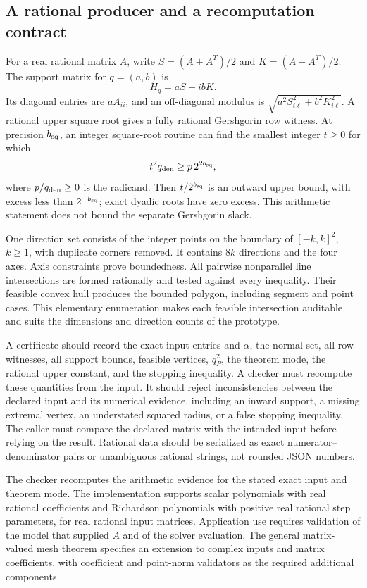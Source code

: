 \documentclass[11pt]{article}
\theoremstyle{definition}
\theoremstyle{remark}
\numberwithin{equation}{section}
\begin{document}
\subsection{A rational producer and a recomputation contract}
For a real rational matrix \(A\), write
\(S=(A+A^T)/2\) and \(K=(A-A^T)/2\).
The support matrix for \(q=(a,b)\) is
\[
 H_q=aS-ibK.
\]
Its diagonal entries are \(aA_{ii}\), and an off-diagonal modulus is
\(\sqrt{a^2S_{i\ell}^2+b^2K_{i\ell}^2}\).
A rational upper square root gives a fully rational Gershgorin row witness.
At precision \(b_{\rm sq}\), an integer square-root routine can find the
smallest integer \(t\ge0\) for which
\[
 t^2 q_{\rm den}\ge p\,2^{2b_{\rm sq}},
\]
where \(p/q_{\rm den}\ge0\) is the radicand.
Then \(t/2^{b_{\rm sq}}\) is an outward upper bound, with excess less
than \(2^{-b_{\rm sq}}\); exact dyadic roots have zero excess.
This arithmetic statement does not bound the separate Gershgorin slack.

One direction set consists of the integer points on the boundary of
\([-k,k]^2\), \(k\ge1\), with duplicate corners removed.
It contains \(8k\) directions and the four axes.
Axis constraints prove boundedness.
All pairwise nonparallel line intersections are formed rationally and tested
against every inequality.
Their feasible convex hull produces the bounded polygon, including segment
and point cases.
This elementary enumeration makes each feasible intersection auditable
and suits the dimensions and direction counts of the prototype.

A certificate should record the exact input entries and \(\alpha\), the
normal set, all row witnesses, all support bounds, feasible vertices,
\(q_P^2\), the theorem mode, the rational upper constant, and the stopping
inequality.
A checker must recompute these quantities from the input.
It should reject inconsistencies between the declared input and its
numerical evidence, including an inward support, a missing extremal
vertex, an understated squared radius, or a false stopping inequality.
The caller must compare the declared matrix with the intended input
before relying on the result.
Rational data should be serialized as exact numerator--denominator pairs or
unambiguous rational strings, not rounded JSON numbers.

The checker recomputes the arithmetic evidence for the stated exact input
and theorem mode.
The implementation supports scalar polynomials with real rational
coefficients and Richardson polynomials with positive real rational step
parameters, for real rational input matrices. Application use requires
validation of the model that supplied \(A\) and of the solver evaluation.
The general matrix-valued mesh theorem specifies an extension to complex
inputs and matrix coefficients, with coefficient and point-norm validators
as the required additional components.
\end{document}
